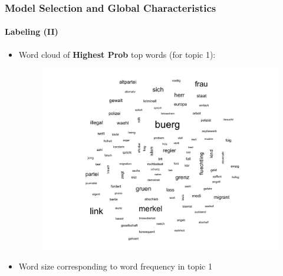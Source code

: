 \documentclass[xcolor=dvipsnames]{beamer}
\begin{document}
\begin{frame}
\frametitle{Model Selection and Global Characteristics}
\framesubtitle{Labeling (II)}
\begin{itemize}
\item Word cloud of \textbf{Highest Prob} top words (for topic 1):
	\begin{figure}[h!]
  	\centering
  	\includegraphics[scale = 0.40]{../plots/4_2/t1_wordcloud.pdf}
	\end{figure}
\item Word size corresponding to word frequency in topic 1
\end{itemize}
\end{frame}
\end{document}
